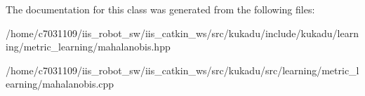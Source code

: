 The documentation for this class was generated from the following files\-:\begin{DoxyCompactItemize}
\item 
/home/c7031109/iis\-\_\-robot\-\_\-sw/iis\-\_\-catkin\-\_\-ws/src/kukadu/include/kukadu/learning/metric\-\_\-learning/mahalanobis.\-hpp\item 
/home/c7031109/iis\-\_\-robot\-\_\-sw/iis\-\_\-catkin\-\_\-ws/src/kukadu/src/learning/metric\-\_\-learning/mahalanobis.\-cpp\end{DoxyCompactItemize}
